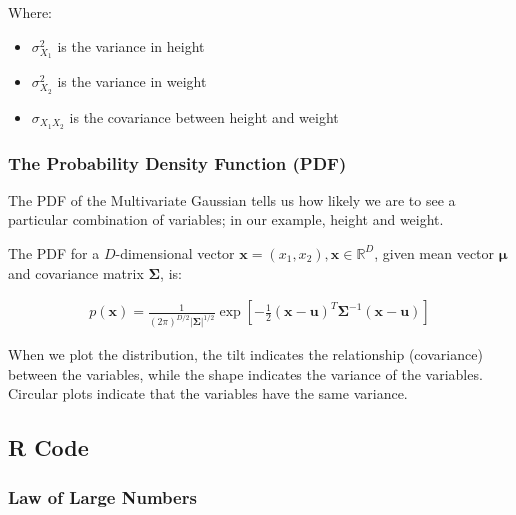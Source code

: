\documentclass{article}
\begin{document}
Where:

\begin{itemize}
    \item $\sigma_{X_1}^2$ is the variance in height
    \item $\sigma_{X_2}^2$ is the variance in weight
    \item $\sigma_{X_1 X_2}$ is the covariance between height and weight
    
\end{itemize}

\subsubsection{The Probability Density Function (PDF)}

The PDF of the Multivariate Gaussian tells us how likely we are to see a particular combination of variables; in our example, height and weight.

The PDF for a $D$-dimensional vector $\boldsymbol{x} = (x_1, x_2), \boldsymbol{x} \in \mathbb{R}^D$, given mean vector $\boldsymbol{\mu}$ and covariance matrix $\boldsymbol{\Sigma}$, is:

\begin{align*}
p(\boldsymbol{x})= \frac {1} {(2\pi)^{D/2} |\boldsymbol{\Sigma}|^{1/2}} \exp{[-\frac 1 2 (\boldsymbol{x} - \boldsymbol{u})^T \boldsymbol{\Sigma}^{-1} (\boldsymbol{x} - \boldsymbol{u})]}
\end{align*}

When we plot the distribution, the tilt indicates the relationship (covariance) between the variables, while the shape indicates the variance of the variables. Circular plots indicate that the variables have the same variance.

\subsection{R Code}

\subsubsection*{Law of Large Numbers}
\end{document}
